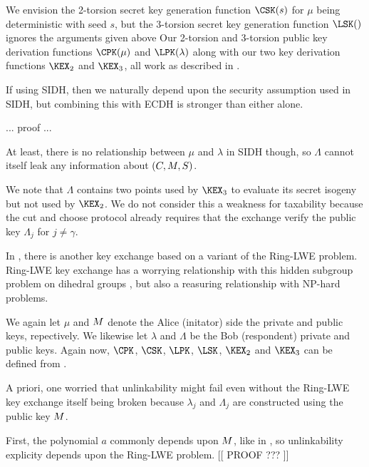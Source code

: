 \documentclass{llncs}
\begin{document}
We envision the 2-torsion secret key generation function $\CSK(s)$
for $\mu$ being deterministic with seed $s$, but the 3-torsion secret
key generation function $\LSK()$ ignores the arguments given above 
Our 2-torsion and 3-torsion public key derivation functions
$\CPK(\mu)$ and $\LPK(\lambda)$ along with our two key derivation
functions $\KEX_2$ and $\KEX_3$, all work as described in
\cite[\S6]{SIDH16}.

If using SIDH, then we naturally depend upon the security assumption
used in SIDH, but combining this with ECDH is stronger than either
alone.  

... proof ...

At least, there is no relationship between $\mu$ and $\lambda$ in
SIDH though, so $\Lambda$ cannot itself leak any information about
$(C,M,S)$.  


We note that $\Lambda$ contains two points used by $\KEX_3$ to
evaluate its secret isogeny but not used by $\KEX_2$.  We do not
consider this a weakness for taxability because the cut and choose
protocol already requires that the exchange verify the public
key $\Lambda_j$ for $j \neq \gamma$. 

\smallskip

In \cite{Peikert14,NewHope}, there is another key exchange based on
a variant of the Ring-LWE problem.  Ring-LWE key exchange has a
worrying relationship with this hidden subgroup problem on dihedral
groups \cite{??,??}, but also a reasuring relationship with NP-hard
problems.

We again let $\mu$ and $M$ denote the Alice (initator) side the
private and public keys, repectively.  We likewise let $\lambda$
and $\Lambda$ be the Bob (respondent) private and public keys. 
Again now, $\CPK$, $\CSK$, $\LPK$, $\LSK$, $\KEX_2$ and $\KEX_3$
can be defined from \cite{Peikert14,NewHope}.  

A priori, one worried that unlinkability might fail even without
the Ring-LWE key exchange itself being broken because $\lambda_j$
and $\Lambda_j$ are constructed using the public key $M$. 

First, the polynomial $a$ commonly depends upon $M$, like in
\cite{NewHope}, so unlinkability explicity depends upon the Ring-LWE
problem\cite{}.  [[ PROOF ??? ]]
\end{document}

